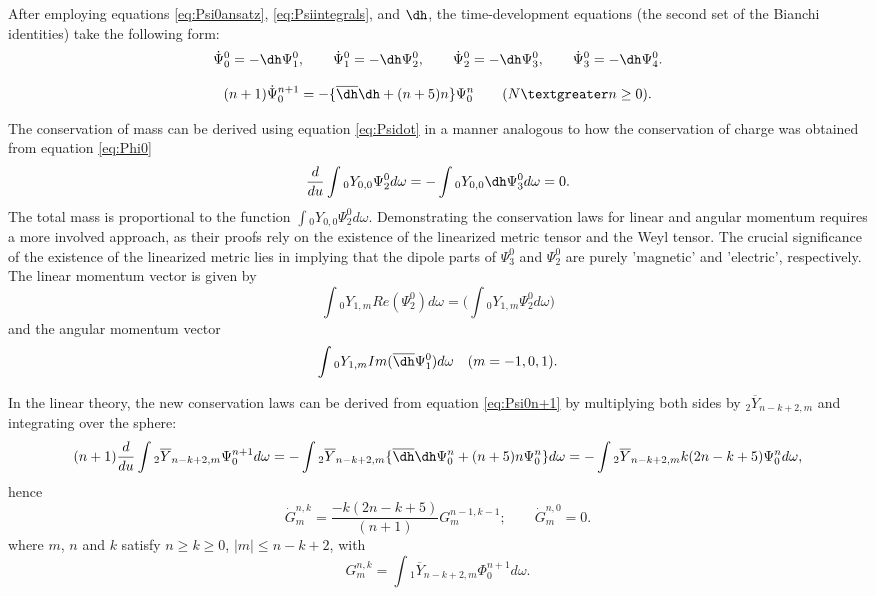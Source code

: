 After employing equations \eqref{eq:Psi0ansatz}, \eqref{eq:Psiintegrals}, and $\dh$, the time-development equations (the second set of the Bianchi identities) take the following form:
\begin{equation}\label{eq:Psidot}
  \dot{\Psi}_{0}^{0} = -\dh \Psi_{1}^{0}, \qquad \dot{\Psi}_{1}^{0} = -\dh \Psi_{2}^{0}, \qquad \dot{\Psi}_{2}^{0} = -\dh \Psi_{3}^{0}, \qquad \dot{\Psi}_{3}^{0} = -\dh \Psi_{4}^{0}.
\end{equation}

\begin{equation}\label{eq:Psi0n+1}
  (n+1)\dot{\Psi}_{0}^{n+1} = -\{\overline{\dh}\dh + (n+5)n\}\Psi_{0}^{n} \qquad (N \textgreater n \geq 0).
\end{equation}

The conservation of mass can be derived using equation \eqref{eq:Psidot} in a manner analogous to how the conservation of charge was obtained from equation \eqref{eq:Phi0}
\begin{equation}\label{eq:YPsi0}
  \frac{d}{du} \int {_{0}Y_{0,0}\Psi_{2}^{0} d\omega} = - \int {_{0}Y_{0,0}\dh \Psi_{3}^{0} d\omega} = 0.
\end{equation}
The total mass is proportional to the function $\int {_{0}Y_{0,0}\Psi_{2}^{0} d\omega}$. Demonstrating the conservation laws for linear and angular momentum requires a more involved approach, as their proofs rely on the existence of the linearized metric tensor and the Weyl tensor. The crucial significance of the existence of the linearized metric lies in implying that the dipole parts of $\Psi_{3}^{0}$ and $\Psi_{2}^{0}$ are purely 'magnetic' and 'electric', respectively. The linear momentum vector is given by
\begin{equation}\label{eq:LinMomentum}
  \int {_{0}Y_{1,m}Re(\Psi_{2}^{0}) d\omega} = \Biggl(\int{_{0}Y_{1,m}\Psi_{2}^{0} d\omega} \Biggr)
\end{equation}
and the angular momentum vector
\begin{equation}\label{eq:AngMomentum}
  \int {_{0}Y_{1,m}Im(\overline{\dh} \Psi_{1}^{0}) d\omega} \quad (m = -1,0,1).
\end{equation}

In the linear theory, the new conservation laws can be derived from equation \eqref{eq:Psi0n+1} by multiplying both sides by $_{2}\overline{Y}_{n-k+2,m}$ and integrating over the sphere:
\begin{equation}\label{eq:intYoverline}
  (n+1)\frac{d}{du}\int{_{2}\overline{Y}_{n-k+2,m}\Psi_{0}^{n+1} d\omega} = - \int{_{2}\overline{Y}_{n-k+2,m}\{\overline{\dh}\dh \Psi_{0}^{n}+(n+5)n\Psi_{0}^{n}\}d\omega} = -\int{_{2}\overline{Y}_{n-k+2,m}k(2n-k+5)\Psi_{0}^{n} d\omega},
\end{equation}
hence 
\begin{equation}\label{eq:Gdot}
  \dot{G}_{m}^{n,k} = \frac{-k(2n-k+5)}{(n+1)}G_{m}^{n-1,k-1} ; \qquad \dot{G}_{m}^{n,0} = 0.
\end{equation}
where $m$, $n$ and $k$ satisfy $n \geq k \geq 0$, $|m| \leq n-k+2$, with
\begin{equation}\label{eq:G}
  G_{m}^{n,k} = \int{_{1}\overline{Y}_{n-k+2,m}\Phi_{0}^{n+1} d\omega}.
\end{equation}

